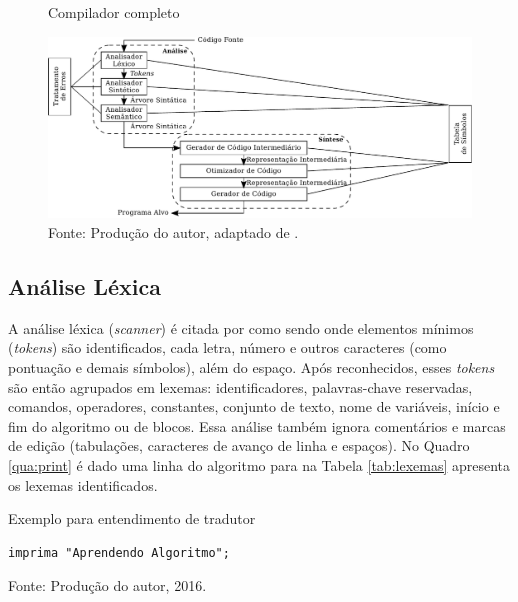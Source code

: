 \begin{figure}[h]
  \caption{Compilador completo}\label{fig:fullcompiler}
  \centering
\includegraphics[width=\textwidth,keepaspectratio]{figures/compilador-completo.pdf}
  \caption*{\footnotesize Fonte: Produção do autor, adaptado de .}
\end{figure}

%
\subsection{Análise Léxica}

A análise léxica (\textit{scanner}) é citada por  como sendo onde elementos mínimos (\textit{tokens}) são identificados, cada letra, número e outros caracteres (como pontuação e demais símbolos), além do espaço. Após reconhecidos, esses \textit{tokens} são então agrupados em lexemas: identificadores, palavras-chave reservadas, comandos, operadores, constantes, conjunto de texto, nome de variáveis, início e fim do algoritmo ou de blocos. Essa análise também ignora comentários e marcas de edição (tabulações, caracteres de avanço de linha e espaços). No Quadro \ref{qua:print} é dado uma linha do algoritmo para na Tabela \ref{tab:lexemas} apresenta os lexemas identificados.

\begin{quadro}[h]
\centering
  \caption{Exemplo para entendimento de tradutor}\label{qua:print}
\begin{lstlisting}[language=ual,frame=single]
  imprima "Aprendendo Algoritmo";
\end{lstlisting}
  \caption*{\footnotesize Fonte: Produção do autor, 2016.}
\end{quadro}

